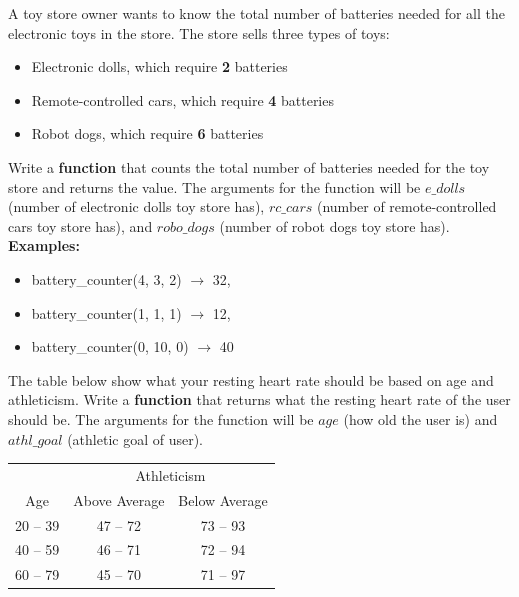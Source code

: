 	\item 
		A toy store owner wants to know the total number of batteries needed for all the electronic toys in the store. 
		The store sells three types of toys:
		\begin{itemize}
			\item Electronic dolls, which require \textbf{2} batteries
			\item Remote-controlled cars, which require \textbf{4} batteries
			\item Robot dogs, which require \textbf{6} batteries
		\end{itemize}


		Write a \textbf{function} that counts the total number of batteries needed for the toy store and returns the value. 
		The arguments for the function will be $e\_dolls$ (number of electronic dolls toy store has), $rc\_cars$ 
		(number of remote-controlled cars toy store has), and $robo\_dogs$ (number of robot dogs toy store has).\\

	\textbf{Examples:}
	\begin{itemize}
		\item  battery\_counter(4, 3, 2) $\rightarrow$ 32, 
		\item  battery\_counter(1, 1, 1) $\rightarrow$ 12, 
		\item  battery\_counter(0, 10, 0) $\rightarrow$ 40 
	\end{itemize}


	\item 
		The table below show what your resting heart rate should be based on age and athleticism. 
		Write a \textbf{function} that returns what the resting heart rate of the user should be. 
		The arguments for the function will be $age$ (how old the user is) and $athl\_goal$ (athletic goal of user).
	\begin{center}
		\begin{minipage}{.45\textwidth}
			\begin{tabular}{c|cc}
				& \multicolumn{2}{c}{Athleticism}\\
				Age & Above Average & Below Average \\ \hline
				20 -- 39 & 47 -- 72 & 73 -- 93\\
				40 -- 59 & 46 -- 71 & 72 -- 94\\
				60 -- 79 & 45 -- 70 & 71 -- 97 \\
			\end{tabular}
		\end{minipage}
	\end{center}

